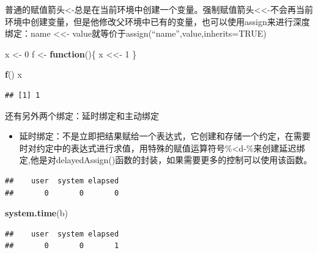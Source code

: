 \documentclass[]{book}
\newenvironment{Shaded}{\begin{snugshade}}{\end{snugshade}}
\newcommand{\KeywordTok}[1]{\textcolor[rgb]{0.13,0.29,0.53}{\textbf{#1}}}
\newcommand{\DecValTok}[1]{\textcolor[rgb]{0.00,0.00,0.81}{#1}}
\newcommand{\StringTok}[1]{\textcolor[rgb]{0.31,0.60,0.02}{#1}}
\newcommand{\ControlFlowTok}[1]{\textcolor[rgb]{0.13,0.29,0.53}{\textbf{#1}}}
\newcommand{\OperatorTok}[1]{\textcolor[rgb]{0.81,0.36,0.00}{\textbf{#1}}}
\newcommand{\NormalTok}[1]{#1}
\providecommand{\tightlist}{%
  \setlength{\itemsep}{0pt}\setlength{\parskip}{0pt}}
\begin{document}
普通的赋值箭头\textless{}-总是在当前环境中创建一个变量。强制赋值箭头\textless{}\textless{}-不会再当前环境中创建变量，但是他修改父环境中已有的变量，也可以使用assign来进行深度绑定：name
\textless{}\textless{}-
value就等价于assign(``name'',value,inherits=TRUE)

\begin{Shaded}
\begin{Highlighting}[]
\NormalTok{x <-}\StringTok{ }\DecValTok{0}
\NormalTok{f <-}\StringTok{ }\ControlFlowTok{function}\NormalTok{()\{}
\NormalTok{  x <<-}\StringTok{ }\DecValTok{1}
\NormalTok{\}}

\KeywordTok{f}\NormalTok{()}
\NormalTok{x}
\end{Highlighting}
\end{Shaded}

\begin{verbatim}
## [1] 1
\end{verbatim}

还有另外两个绑定：延时绑定和主动绑定

\begin{itemize}
\tightlist
\item
  延时绑定：不是立即把结果赋给一个表达式，它创建和存储一个约定，在需要时对约定中的表达式进行求值，用特殊的赋值运算符号\%\textless{}d-\%来创建延迟绑定,他是对delayedAssign()函数的封装，如果需要更多的控制可以使用该函数。
\end{itemize}

\begin{Shaded}
\end{Shaded}

\begin{verbatim}
##    user  system elapsed 
##       0       0       0
\end{verbatim}

\begin{Shaded}
\begin{Highlighting}[]
\KeywordTok{system.time}\NormalTok{(b)}
\end{Highlighting}
\end{Shaded}

\begin{verbatim}
##    user  system elapsed 
##       0       0       1
\end{verbatim}
\end{document}
